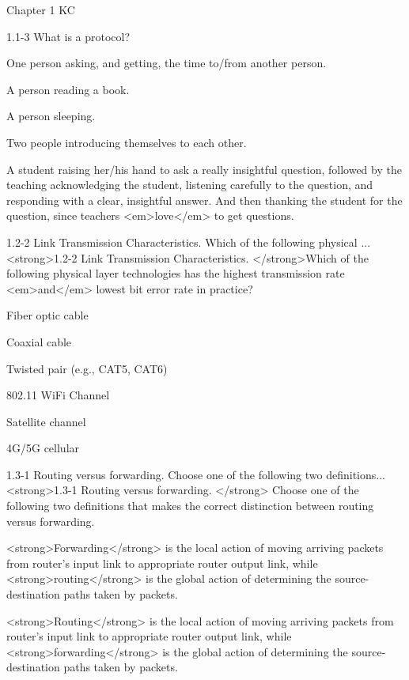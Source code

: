 \documentclass[a4paper]{article}
\begin{document}
\begin{quiz}{Chapter 1 KC}
\begin{multi}[points=1,multiple]{1.1-3 What is a protocol?}
\item[fraction=33.33333] One person asking, and getting, the time to/from another person.
\item[feedback={Not quite! This answer is not correct.},] A person reading a book.
\item[feedback={Not quite! This answer is not correct.},] A person sleeping.
\item[fraction=33.33333] Two people introducing themselves to each other.
\item[fraction=33.33333] A student raising her/his hand to ask a really insightful question, followed by the teaching acknowledging the student, listening carefully to the question, and responding with a clear, insightful answer.  And then thanking the student for the question, since teachers <em>love</em> to get questions.
\end{multi}

\begin{multi}[points=1]{1.2-2 Link Transmission Characteristics. Which of the following physical ...}
<strong>1.2-2 Link Transmission Characteristics. </strong>Which of the following physical layer technologies has the highest transmission rate <em>and</em> lowest bit error rate in practice?
\item* Fiber optic cable
\item Coaxial cable
\item Twisted pair (e.g., CAT5, CAT6)
\item 802.11 WiFi Channel
\item Satellite channel
\item 4G/5G cellular
\end{multi}

\begin{multi}[points=1]{1.3-1 Routing versus forwarding.  Choose one of the following two definitions...}
<strong>1.3-1 Routing versus forwarding. </strong> Choose one of the following two definitions that makes the correct distinction between routing versus forwarding.
\item* <strong>Forwarding</strong> is the local action of moving arriving packets from router’s input link to appropriate router output link, while <strong>routing</strong> is the global action of determining the source-destination paths taken by packets.
\item <strong>Routing</strong> is the local action of moving arriving packets from router’s input link to appropriate router output link, while <strong>forwarding</strong> is the global action of determining the source-destination paths taken by packets.
\end{multi}


\end{quiz}
\end{document}
